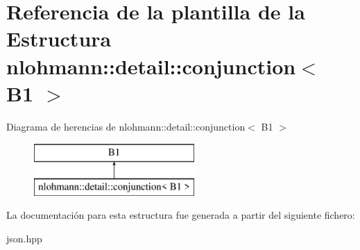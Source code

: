 \hypertarget{structnlohmann_1_1detail_1_1conjunction_3_01B1_01_4}{}\section{Referencia de la plantilla de la Estructura nlohmann\+:\+:detail\+:\+:conjunction$<$ B1 $>$}
\label{structnlohmann_1_1detail_1_1conjunction_3_01B1_01_4}
Diagrama de herencias de nlohmann\+:\+:detail\+:\+:conjunction$<$ B1 $>$\begin{figure}[H]
\begin{center}
\leavevmode
\includegraphics[height=2.000000cm]{structnlohmann_1_1detail_1_1conjunction_3_01B1_01_4}
\end{center}
\end{figure}


La documentación para esta estructura fue generada a partir del siguiente fichero\+:\begin{DoxyCompactItemize}
\item 
json.\+hpp\end{DoxyCompactItemize}

